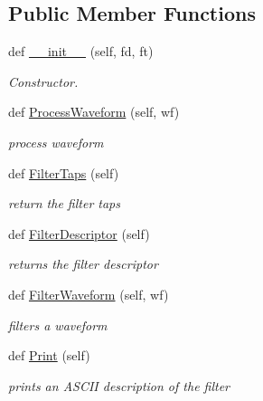 \subsection*{Public Member Functions}
\begin{DoxyCompactItemize}
\item 
def \hyperlink{classSignalIntegrity_1_1TimeDomain_1_1Filters_1_1FirFilter_1_1FirFilter_aa769a401c278ca11fba676e33af50456}{\+\_\+\+\_\+init\+\_\+\+\_\+} (self, fd, ft)
\begin{DoxyCompactList}\small\item\em Constructor. \end{DoxyCompactList}\item 
def \hyperlink{classSignalIntegrity_1_1TimeDomain_1_1Filters_1_1FirFilter_1_1FirFilter_ae09bec195c9cb1d5819e73b7be169b11}{Process\+Waveform} (self, wf)
\begin{DoxyCompactList}\small\item\em process waveform \end{DoxyCompactList}\item 
def \hyperlink{classSignalIntegrity_1_1TimeDomain_1_1Filters_1_1FirFilter_1_1FirFilter_a215bb8b37eed7c3d66ece034a41dcb75}{Filter\+Taps} (self)
\begin{DoxyCompactList}\small\item\em return the filter taps \end{DoxyCompactList}\item 
def \hyperlink{classSignalIntegrity_1_1TimeDomain_1_1Filters_1_1FirFilter_1_1FirFilter_a68fed1ece509bfbd2f3ae97633d5579d}{Filter\+Descriptor} (self)
\begin{DoxyCompactList}\small\item\em returns the filter descriptor \end{DoxyCompactList}\item 
def \hyperlink{classSignalIntegrity_1_1TimeDomain_1_1Filters_1_1FirFilter_1_1FirFilter_a84e73c18250ca4a61482f94ad61e735b}{Filter\+Waveform} (self, wf)
\begin{DoxyCompactList}\small\item\em filters a waveform \end{DoxyCompactList}\item 
\mbox{\label{classSignalIntegrity_1_1TimeDomain_1_1Filters_1_1FirFilter_1_1FirFilter_a0203fc9c617eec80ba28741251ee3b86}} 
def \hyperlink{classSignalIntegrity_1_1TimeDomain_1_1Filters_1_1FirFilter_1_1FirFilter_a0203fc9c617eec80ba28741251ee3b86}{Print} (self)
\begin{DoxyCompactList}\small\item\em prints an A\+S\+C\+II description of the filter \end{DoxyCompactList}\end{DoxyCompactItemize}


